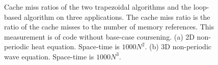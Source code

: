 \begin{figure}[t]
\centering

\subfigure[]{}
\label{fig:heat2DNPCache}

\subfigure[]{}
\label{fig:dfdCache}
\caption{Cache miss ratios of the two trapezoidal algorithms and the loop-based algorithm on three applications.  The cache miss ratio is the ratio of the cache misses to the number of memory references.  This measurement is of code without base-case coursening.
 (a) 2D non-periodic heat equation.  Space-time is $1000N^2$.
 (b) 3D non-periodic wave equation.  Space-time is $1000N^3$.
}
\label{fig:CacheComplexity}
\end{figure}


